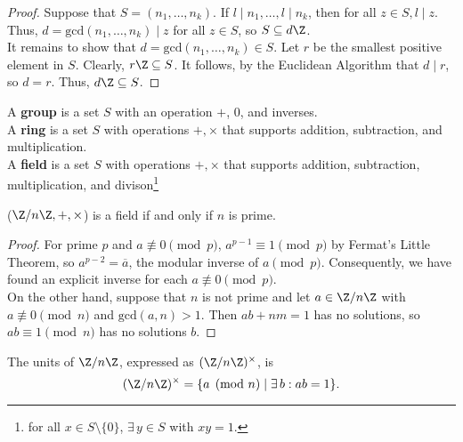 \documentclass[11pt]{article}
\begin{document}
\begin{proof}
Suppose that $S = (n_1, \dots, n_k).$ If $l \mid n_1, \dots, l \mid n_k$, then for all $z \in S, l \mid z$. 
Thus, $d = \mathrm{gcd}(n_1, \dots, n_k) \mid z$ for all $z \in S$, so $S \subseteq d\Z$. \\

It remains to show that $d = \mathrm{gcd}(n_1, \dots, n_k) \in S.$ Let $r$ be the smallest positive element in $S$. Clearly, $r\Z \subseteq S$. 
It follows, by the Euclidean Algorithm that $d \mid r$, so $d = r$. Thus, $d\Z \subseteq S$.
\end{proof}

\begin{definition}
A \textbf{group} is a set $S$ with an operation $+$, $0$, and inverses. \\

A \textbf{ring} is a set $S$ with operations $+, \times$ that supports addition, subtraction, and multiplication. \\

A \textbf{field} is a set $S$ with operations $+, \times$ that supports addition, subtraction, multiplication, and divison\footnote{for all $x \in S \setminus \{0\}$, $\exists \, y \in S$ with $xy = 1$.}
\end{definition}

\begin{theorem}
($\Z / n\Z, +, \times$) is a field if and only if $n$ is prime.
\end{theorem}

\begin{proof}
For prime $p$ and $a \not\equiv 0 \pmod p$, $a^{p-1} \equiv 1 \pmod p$ by Fermat's Little Theorem, so $a^{p-2} = \overline{a}$, the modular inverse of $a \pmod p.$ Consequently, we have
found an explicit inverse for each $a \not\equiv 0 \pmod p$. \\

On the other hand, suppose that $n$ is not prime and let $a \in \Z / n\Z$ with $a \not\equiv 0 \pmod n$ and $\mathrm{gcd}(a, n) > 1$. Then $ab + nm = 1$ has no solutions, so $ab \equiv 1 \pmod n$ has no solutions $b$.  
\end{proof}

\begin{definition}[Units]
The units of $\Z / n\Z$, expressed as $(\Z / n\Z)^{\times}$, is
\[
    (\Z / n\Z)^{\times} = \{ a \pmod{n} \mid \exists \,b : ab = 1 \}.
\]
\end{definition}
\end{document}
